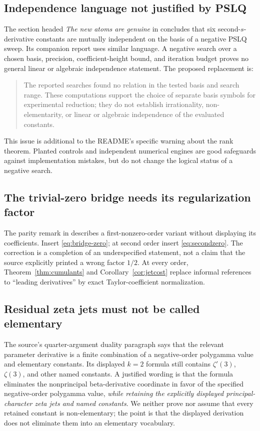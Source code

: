 \documentclass[11pt]{article}
\theoremstyle{definition}
\theoremstyle{remark}
\begin{document}
\subsection{Independence language not justified by PSLQ}
The section headed \emph{The new atoms are genuine} in \cite{RepoTower} concludes that six second-$s$-derivative constants are mutually independent on the basis of a negative PSLQ sweep. Its companion report uses similar language. A negative search over a chosen basis, precision, coefficient-height bound, and iteration budget proves no general linear or algebraic independence statement. The proposed replacement is:
\begin{quote}
The reported searches found no relation in the tested basis and search range. These computations support the choice of separate basis symbols for experimental reduction; they do not establish irrationality, non-elementarity, or linear or algebraic independence of the evaluated constants.
\end{quote}
This issue is additional to the README's specific warning about the rank theorem. Planted controls and independent numerical engines are good safeguards against implementation mistakes, but do not change the logical status of a negative search.

\subsection{The trivial-zero bridge needs its regularization factor}
The parity remark in \cite{RepoTower} describes a first-nonzero-order variant without displaying its coefficients. Insert \eqref{eq:bridge-zero}; at second order insert \eqref{eq:secondzero}. The correction is a completion of an underspecified statement, not a claim that the source explicitly printed a wrong factor $1/2$. At every order, Theorem~\ref{thm:cumulants} and Corollary~\ref{cor:jetcost} replace informal references to ``leading derivatives'' by exact Taylor-coefficient normalization.

\subsection{Residual zeta jets must not be called elementary}
The source's quarter-argument duality paragraph says that the relevant parameter derivative is a finite combination of a negative-order polygamma value and elementary constants. Its displayed $k=2$ formula still contains $\zeta'(3)$, $\zeta(3)$, and other named constants. A justified wording is that the formula eliminates the nonprincipal beta-derivative coordinate in favor of the specified negative-order polygamma value, \emph{while retaining the explicitly displayed principal-character zeta jets and named constants}. We neither prove nor assume that every retained constant is non-elementary; the point is that the displayed derivation does not eliminate them into an elementary vocabulary.
\end{document}
